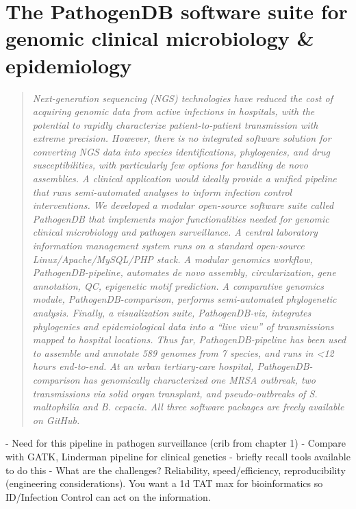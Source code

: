 
\chapter{The PathogenDB software suite for genomic clinical microbiology \& epidemiology}
\label{chap:pathogendb}

\begin{quote}
\emph{Next-generation sequencing (NGS) technologies have reduced the cost of acquiring genomic data from active infections in hospitals, with the potential to rapidly characterize patient-to-patient transmission with extreme precision. However, there is no integrated software solution for converting NGS data into species identifications, phylogenies, and drug susceptibilities, with particularly few options for handling \emph{de novo} assemblies. A clinical application would ideally provide a unified pipeline that runs semi-automated analyses to inform infection control interventions. We developed a modular open-source software suite called PathogenDB that implements major functionalities needed for genomic clinical microbiology and pathogen surveillance. A central laboratory information management system runs on a standard open-source Linux/Apache/MySQL/PHP stack. A modular genomics workflow, PathogenDB-pipeline, automates de novo assembly, circularization, gene annotation, QC, epigenetic motif prediction. A comparative genomics module, PathogenDB-comparison, performs semi-automated phylogenetic analysis. Finally, a visualization suite, PathogenDB-viz, integrates phylogenies and epidemiological data into a ``live view'' of transmissions mapped to hospital locations. Thus far, PathogenDB-pipeline has been used to assemble and annotate 589 genomes from 7 species, and runs in <12 hours end-to-end. At an urban tertiary-care hospital, PathogenDB-comparison has genomically characterized one MRSA outbreak, two transmissions via solid organ transplant, and pseudo-outbreaks of \emph{S. maltophilia} and \emph{B. cepacia}. All three software packages are freely available on GitHub.
}
\end{quote}

- Need for this pipeline in pathogen surveillance (crib from chapter 1)
- Compare with GATK, Linderman pipeline for clinical genetics
- briefly recall tools available to do this
- What are the challenges? Reliability, speed/efficiency, reproducibility (engineering considerations). You want a 1d TAT max for bioinformatics so ID/Infection Control can act on the information.

